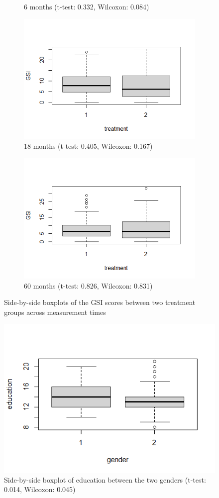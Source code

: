 \begin{figure}[H]
\begin{subfigure}{.19\textwidth}
  \caption{6 months (t-test: 0.332, Wilcoxon: 0.084)}
\end{subfigure}
\begin{subfigure}{.19\textwidth}
  \includegraphics[width=1\linewidth]{../../plots/box_between_group_18.png}
  \caption{18 months (t-test: 0.405, Wilcoxon: 0.167)}
\end{subfigure}
\begin{subfigure}{.19\textwidth}
  \includegraphics[width=1\linewidth]{../../plots/box_between_group_60.png}
  \caption{60 months (t-test: 0.826, Wilcoxon: 0.831)}
\end{subfigure}
\caption{Side-by-side boxplots of the GSI scores between two treatment groups across measurement times}
\label{fig:boxplot.between.groups}
\end{figure}

\begin{figure}[H]
\centering
\includegraphics[width=0.5\linewidth]{../../plots/box_correlation.png}
\caption{Side-by-side boxplot of education between the two genders (t-test: 0.014, Wilcoxon: 0.045)}
\label{tab:boxplot.correlation}
\end{figure}